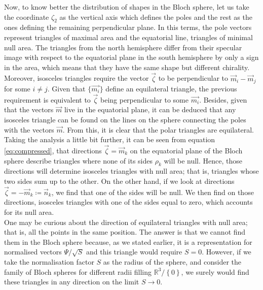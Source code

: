 Now, to know better the distribution of shapes in the Bloch sphere, let us take the coordinate $\zeta_2$ as the vertical axis which defines the poles and the rest as the ones defining the remaining perpendicular plane. In this terms, the pole vectors represent triangles of maximal area and the equatorial line, triangles of minimal null area. The triangles from the north hemisphere differ from their specular image with respect to the equatorial plane in the south hemisphere by only a sign in the area, which means that they have the same shape but different chirality.\\

Moreover, isosceles triangles require the vector $\vec{\zeta}$ to be perpendicular to $\vec{m}_i-\vec{m}_j$ for some $i \neq j$. Given that $\{\vec{m_i}\}$ define an equilateral triangle, the previous requirement is equivalent to $\vec{\zeta}$ being perpendicular to some $\vec{m_i}$. Besides, given that the vectors $\vec{m}$ live in the equatorial plane, it can be deduced that any isosceles triangle can be found on the lines on the sphere connecting the poles with the vectors $\vec{m}$. From this, it is clear that the polar triangles are equilateral.\\

Taking the analysis a little bit further, it can be seen from equation \eqref{eq:compressed}, that directions $\vec{\zeta} = \vec{m}_k$ on the equatorial plane of the Bloch sphere describe triangles where none of its sides $\rho_k$ will be null. Hence, those directions will determine isosceles triangles with null area; that is, triangles whose two sides sum up to the other. On the other hand, if we look at directions $\vec{\zeta} = -\vec{m}_k \coloneqq \vec{n}_k$, we find that one of the sides will be null. We then find on those directions, isosceles triangles with one of the sides equal to zero, which accounts for its null area.\\

One may be curious about the direction of equilateral triangles with null area; that is, all the points in the same position.  The answer is that we cannot find them in the Bloch sphere because, as we stated earlier, it is a representation for normalised vectors $\Psi/\sqrt{S}$ and this triangle would require $S=0$. However, if we take the normalisation factor $S$ as the radius of the sphere, and consider the family of Bloch spheres for different radii filling $\mathbb{R}^3/\left\{0\right\}$, we surely would find these triangles in any direction on the limit $S\to 0$.\\


